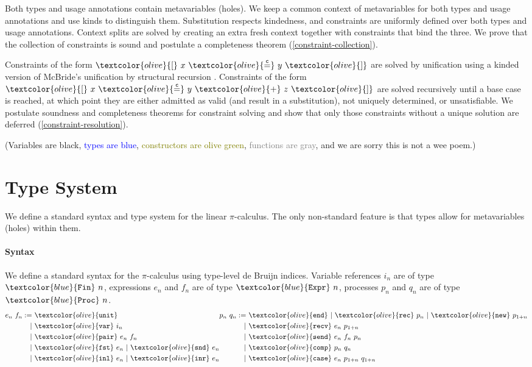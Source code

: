 \documentclass[sigplan,screen,review]{acmart}
\newcommand{\picalc}{$\pi$-calculus}
\newcommand{\constr}[1]{\textcolor{olive}{\mathtt{#1}}}
\newcommand{\type}[1]{\textcolor{blue}{\mathtt{#1}}}
\newcommand{\Fin}[1]{\type{Fin}~#1}
\newcommand{\sExpr}[1]{\type{Expr}~#1}
\newcommand{\sProc}[1]{\type{Proc}~#1}
\newcommand{\sunit}{\constr{unit}}
\newcommand{\svar}{\constr{var}}
\newcommand{\sfst}{\constr{fst}}
\newcommand{\ssnd}{\constr{snd}}
\newcommand{\sinl}{\constr{inl}}
\newcommand{\sinr}{\constr{inr}}
\newcommand{\spair}{\constr{pair}}
\newcommand{\send}{\constr{end}}
\newcommand{\snew}{\constr{new}}
\newcommand{\scomp}{\constr{comp}}
\newcommand{\srecv}{\constr{recv}}
\newcommand{\ssend}{\constr{send}}
\newcommand{\scase}{\constr{case}}
\newcommand{\srec}{\constr{rec}}
\newcommand{\eqconstr}[2]{\constr{[} ~ #1 ~ \constr{\stackrel{c}{=}} ~ #2 ~ \constr{]}}
\newcommand{\sumconstr}[3]{\constr{[} ~ #1 ~ \constr{\stackrel{c}{=}} ~ #2 ~ \constr{+} ~ #3 ~ \constr{]}}
\begin{document}
Both types and usage annotations contain metavariables (holes).
We keep a common context of metavariables for both types and usage annotations and use kinds to distinguish them.
Substitution respects kindedness, and constraints are uniformly defined over both types and usage annotations.
Context splits are solved by creating an extra fresh context together with constraints that bind the three.
We prove that the collection of constraints is sound and postulate a completeness theorem (\autoref{constraint-collection}).

Constraints of the form $\eqconstr{x}{y}$ are solved by unification using a kinded version of McBride's unification by structural recursion \cite{McBride03}.
Constraints of the form $\sumconstr{x}{y}{z}$ are solved recursively until a base case is reached, at which point they are either admitted as valid (and result in a substitution), not uniquely determined, or unsatisfiable.
We postulate soundness and completeness theorems for constraint solving and show that only those constraints without a unique solution are deferred (\autoref{constraint-resolution}).

(Variables are black, \textcolor{blue}{types are blue}, \textcolor{olive}{constructors are olive green}, \textcolor{gray}{functions are gray}, and we are sorry this is not a wee poem.)


\section{Type System}

We define a standard syntax and type system for the linear \picalc{}.
The only non-standard feature is that types allow for metavariables (holes) within them.

\paragraph{Syntax}
\label{syntax}

We define a standard syntax for the \picalc{} using type-level de Bruijn indices.
Variable references $i_n$ are of type $\Fin{n}$, expressions $e_n$ and $f_n$ are of type $\sExpr{n}$, processes $p_n$ and $q_n$ are of type $\sProc{n}$.
\[
\begin{aligned}[c]
  e_n ~ f_n  :=
  &~ \sunit \\
  |&~ \svar~i_n \\
  |&~ \spair~e_n~f_n \\
  |&~ \sfst~e_n ~|~  \ssnd~e_n \\
  |&~ \sinl~e_n ~|~  \sinr~e_n
\end{aligned}
\begin{aligned}[c]
  p_n ~ q_n  :=
  &~ \send ~|~  \srec~p_n ~|~ \snew~p_{1+n} \\
  |&~ \srecv~e_n~p_{1+n} \\
  |&~ \ssend~e_n~f_n~p_n \\
  |&~ \scomp~p_n~q_n \\
  |&~ \scase~e_n~p_{1+n}~q_{1+n} \\
\end{aligned}
\]
\end{document}
